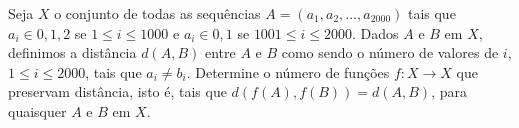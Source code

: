 Seja $X$ o conjunto de todas as sequências $A = (a_1, a_2, \dots, a_{2000})$ tais que $a_i \in {0,1,2}$ se $1 \le i \le 1000$ e $a_i \in {0,1}$ se $1001 \le i \le 2000$.
Dados $A$ e $B$ em $X$, definimos a distância $d(A, B)$ entre $A$ e $B$ como sendo o número de valores de $i$, $1 \le i \le 2000$, tais que $a_i \neq b_i$.
Determine o número de funções $f: X \to X$ que preservam distância, isto é, tais que $d(f(A),f(B)) = d(A,B)$, para quaisquer $A$ e $B$ em $X$.